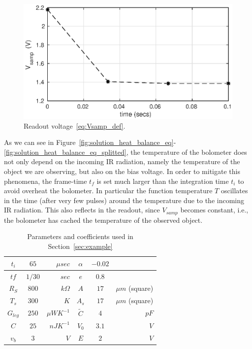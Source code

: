 \begin{figure}
\includegraphics[scale=0.9]{gfx/fig1_Vout_several_pulses.eps} 
\caption{Readout voltage~\eqref{eq:Vsamp_def}.}
\label{fig:Vout}
\end{figure}

As we can see in Figure~\ref{fig:solution_heat_balance_eq}-\ref{fig:solution_heat_balance_eq_splitted}, the temperature of the bolometer does not only depend on the incoming IR radiation, namely the temperature of the object we are observing, but also on the bias voltage. In order to mitigate this phenomena, the frame-time $t_f$ is set much larger than the integration time $t_i$ to avoid overheat the bolometer. In particular the function temperature $T$ oscillates in the time (after very few pulses) around the temperature due to the incoming IR radiation. This also reflects in the readout, since $V_{samp}$ becomes constant, i.e., the bolometer has cached the temperature of the observed object.

\begin{center}
\begin{table}[]
\centering
\caption{Parameters and coefficients used in Section~\ref{sec:example}}
\label{tab:par_coeffs_example}
\begin{tabular}{|c|cr|c|cr|}
\hline
 $t_i$ 		& $65$ 		& $  \mu sec$ 		& $\alpha$  	&    	$-0.02$	&			\\
\hline 
 $tf$ 		& $1/30$ 	& $  sec$ 	 	& $e$ 		&    	$0.8$ 	&			\\
\hline 
 $R_S$ 		& $800 $ 	& $  k \Omega$ 		& $A$ 		&    	$17  $ 	& $ \mu m$ (square)	\\
\hline 
 $T_s$		& $300 $ 	& $  K$ 	 	& $A_s$ 	&    	$17  $ 	& $ \mu m$ (square)	\\  
\hline 
 $G_{leg}$	&  $250 $ 	& $   \mu W K^{-1}$	& $\tilde C$ 	&	$4$ 	& $   p F$		\\   
\hline 
 $C$		&  $25 $ 	& $   n J K^{-1}$ 	& $V_0$		& 	$3.1$ 	& $   V$		\\
\hline 
 $v_b$		& $3 $ 		& $   V$		& $E$		& 	$2$ 	& $   V$		\\
\hline 
\end{tabular}
\end{table} 
\end{center}

